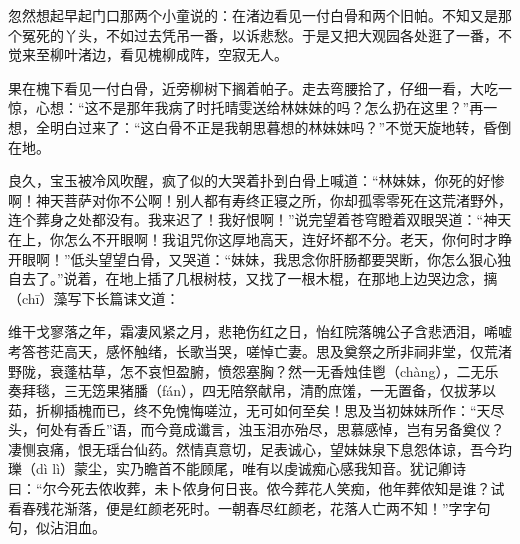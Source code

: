 \documentclass[12pt,oneside]{book}
\begin{document}
忽然想起早起门口那两个小童说的：在渚边看见一付白骨和两个旧帕。不知又是那个冤死的丫头，不如过去凭吊一番，以诉悲愁。于是又把大观园各处逛了一番，不觉来至柳叶渚边，看见槐柳成阵，空寂无人。

果在槐下看见一付白骨，近旁柳树下搁着帕子。走去弯腰拾了，仔细一看，大吃一惊，心想：“这不是那年我病了时托晴雯送给林妹妹的吗？怎么扔在这里？”再一想，全明白过来了：“这白骨不正是我朝思暮想的林妹妹吗？”不觉天旋地转，昏倒在地。

良久，宝玉被冷风吹醒，疯了似的大哭着扑到白骨上喊道：“林妹妹，你死的好惨啊！神天菩萨对你不公啊！别人都有寿终正寝之所，你却孤零零死在这荒渚野外，连个葬身之处都没有。我来迟了！我好恨啊！”说完望着苍穹瞪着双眼哭道：“神天在上，你怎么不开眼啊！我诅咒你这厚地高天，连好坏都不分。老天，你何时才睁开眼啊！”低头望望白骨，又哭道：“妹妹，我思念你肝肠都要哭断，你怎么狠心独自去了。”说着，在地上插了几根树枝，又找了一根木棍，在那地上边哭边念，摛（chī）藻写下长篇诔文道：

维干戈寥落之年，霜凄风紧之月，悲艳伤红之日，怡红院落魄公子含悲洒泪，唏嘘考答苍茫高天，感怀触绪，长歌当哭，嗟悼亡妻。思及奠祭之所非祠非堂，仅荒渚野陇，衰蓬枯草，怎不哀怛盈腑，愤怨塞胸？然一无香烛佳鬯（chàng），二无乐奏拜毯，三无笾果猪膰（fán），四无陪祭献帛，清酌庶馐，一无置备，仅拔茅以茹，折柳插槐而已，终不免愧悔嗟泣，无可如何至矣！思及当初妹妹所作：“天尽头，何处有香丘”语，而今竟成谶言，浊玉泪亦殆尽，思慕感悼，岂有另备奠仪？凄恻哀痛，恨无瑶台仙药。然情真意切，足表诚心，望妹妹泉下息怨体谅，吾今玓瓅（dì lì）蒙尘，实乃瞻首不能顾尾，唯有以虔诚痴心感我知音。犹记卿诗曰：“尔今死去侬收葬，未卜侬身何日丧。侬今葬花人笑痴，他年葬侬知是谁？试看春残花渐落，便是红颜老死时。一朝春尽红颜老，花落人亡两不知！”字字句句，似沾泪血。
\end{document}
